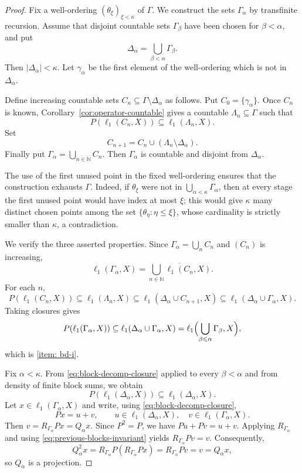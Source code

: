 \documentclass[11pt]{amsart}
\theoremstyle{plain}
\theoremstyle{definition}
\numberwithin{equation}{section}
\newcommand{\abs}[1]{\left|#1\right|}
\newcommand{\N}{\mathbb{N}}
\renewcommand{\le}{\leqslant}
\begin{document}
\begin{proof}
Fix a well-ordering $(\theta_\xi)_{\xi<\kappa}$ of $\Gamma$.  We construct the sets $\Gamma_\alpha$ by transfinite recursion.  Assume that disjoint countable sets $\Gamma_\beta$ have been chosen for $\beta<\alpha$, and put
\[
    \Delta_\alpha=\bigcup_{\beta<\alpha}\Gamma_\beta.
\]
Then $\abs{\Delta_\alpha}<\kappa$.  Let $\gamma_\alpha$ be the first element of the well-ordering which is not in $\Delta_\alpha$.

Define increasing countable sets $C_n\subseteq\Gamma\setminus\Delta_\alpha$ as follows.  Put $C_0=\{\gamma_\alpha\}$.  Once $C_n$ is known, Corollary~\ref{cor:operator-countable} gives a countable $\Lambda_n\subseteq\Gamma$ such that
\[
    P(\ell_1(C_n,X))\subseteq \ell_1(\Lambda_n,X).
\]
Set
\[
    C_{n+1}=C_n\cup(\Lambda_n\setminus\Delta_\alpha).
\]
Finally put $\Gamma_\alpha=\bigcup_{n\in\N}C_n$.  Then $\Gamma_\alpha$ is countable and disjoint from $\Delta_\alpha$.

The use of the first unused point in the fixed well-ordering ensures that the construction exhausts $\Gamma$.  Indeed, if $\theta_\xi$ were not in $\bigcup_{\alpha<\kappa}\Gamma_\alpha$, then at every stage the first unused point would have index at most $\xi$; this would give $\kappa$ many distinct chosen points among the set $\{\theta_\eta:\eta\le\xi\}$, whose cardinality is strictly smaller than $\kappa$, a contradiction.

We verify the three asserted properties.  Since $\Gamma_\alpha=\bigcup_n C_n$ and $(C_n)$ is increasing,
\[
    \ell_1(\Gamma_\alpha,X)=\overline{\bigcup_{n\in\N}\ell_1(C_n,X)}.
\]
For each $n$,
\[
    P(\ell_1(C_n,X))
    \subseteq \ell_1(\Lambda_n,X)
    \subseteq \ell_1(\Delta_\alpha\cup C_{n+1},X)
    \subseteq \ell_1(\Delta_\alpha\cup\Gamma_\alpha,X).
\]
Taking closures gives
\begin{equation}\label{eq:block-decomp-closure}
    P(\ell_1(\Gamma_\alpha,X))
    \subseteq \ell_1(\Delta_\alpha\cup\Gamma_\alpha,X)
    =\ell_1\Bigl(\bigcup_{\beta\le\alpha}\Gamma_\beta,X\Bigr),
\end{equation}
which is \ref{item: bd-i}.

Fix $\alpha<\kappa$.  From \eqref{eq:block-decomp-closure} applied to every $\beta<\alpha$ and from density of finite block sums, we obtain
\begin{equation}\label{eq:previous-blocks-invariant}
    P(\ell_1(\Delta_\alpha,X))\subseteq \ell_1(\Delta_\alpha,X).
\end{equation}
Let $x\in\ell_1(\Gamma_\alpha,X)$ and write, using \eqref{eq:block-decomp-closure},
\[
    Px=u+v,
    \qquad
    u\in\ell_1(\Delta_\alpha,X),\quad v\in\ell_1(\Gamma_\alpha,X).
\]
Then $v=R_{\Gamma_\alpha}Px=Q_\alpha x$.  Since $P^2=P$, we have $P u+P v=u+v$.  Applying $R_{\Gamma_\alpha}$ and using \eqref{eq:previous-blocks-invariant} yields
\(
    R_{\Gamma_\alpha}P v=v.
\)
Consequently,
\[
    Q_\alpha^2x
    =R_{\Gamma_\alpha}P(R_{\Gamma_\alpha}Px)
    =R_{\Gamma_\alpha}P v
    =v
    =Q_\alpha x,
\]
so $Q_\alpha$ is a projection.


\end{proof}
\end{document}
